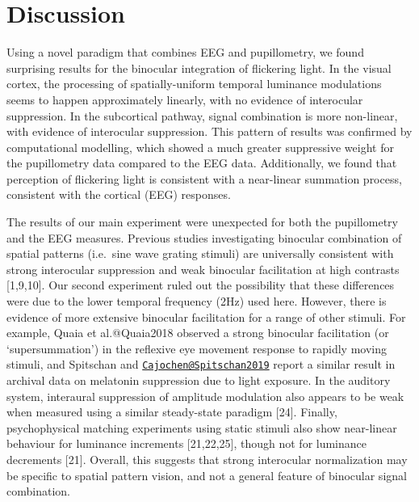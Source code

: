 \documentclass[
]{article}
\begin{document}
\hypertarget{discussion}{%
\section{Discussion}\label{discussion}}

Using a novel paradigm that combines EEG and pupillometry, we found surprising results for the binocular integration of flickering light. In the visual cortex, the processing of spatially-uniform temporal luminance modulations seems to happen approximately linearly, with no evidence of interocular suppression. In the subcortical pathway, signal combination is more non-linear, with evidence of interocular suppression. This pattern of results was confirmed by computational modelling, which showed a much greater suppressive weight for the pupillometry data compared to the EEG data. Additionally, we found that perception of flickering light is consistent with a near-linear summation process, consistent with the cortical (EEG) responses.

The results of our main experiment were unexpected for both the pupillometry and the EEG measures. Previous studies investigating binocular combination of spatial patterns (i.e.~sine wave grating stimuli) are universally consistent with strong interocular suppression and weak binocular facilitation at high contrasts {[}1,9,10{]}. Our second experiment ruled out the possibility that these differences were due to the lower temporal frequency (2Hz) used here. However, there is evidence of more extensive binocular facilitation for a range of other stimuli. For example, Quaia et al.@Quaia2018 observed a strong binocular facilitation (or `supersummation') in the reflexive eye movement response to rapidly moving stimuli, and Spitschan and \href{mailto:Cajochen@Spitschan2019}{\nolinkurl{Cajochen@Spitschan2019}} report a similar result in archival data on melatonin suppression due to light exposure. In the auditory system, interaural suppression of amplitude modulation also appears to be weak when measured using a similar steady-state paradigm {[}24{]}. Finally, psychophysical matching experiments using static stimuli also show near-linear behaviour for luminance increments {[}21,22,25{]}, though not for luminance decrements {[}21{]}. Overall, this suggests that strong interocular normalization may be specific to spatial pattern vision, and not a general feature of binocular signal combination.
\end{document}
